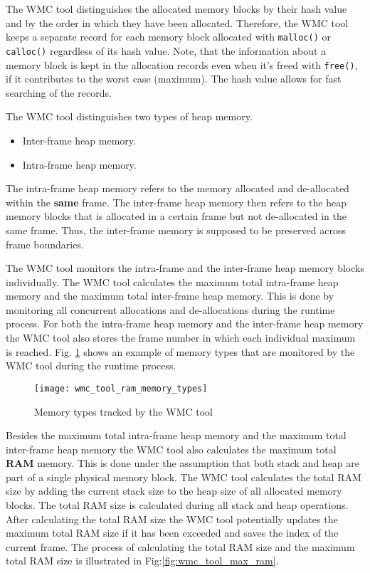 The WMC tool distinguishes the allocated memory blocks by their hash value and by the order in which they have been allocated. Therefore, the WMC tool keeps a separate record for each memory block allocated with \verb|malloc()| or \verb|calloc()| regardless of its hash value. Note, that the information about a memory block is kept in the allocation records even when it's freed with \verb|free()|, if it contributes to the worst case (maximum). The hash value allows for fast searching of the records.

The WMC tool distinguishes two types of heap memory.

\begin{itemize}
  \item Inter-frame heap memory.
  \item Intra-frame heap memory.
\end{itemize}

The intra-frame heap memory refers to the memory allocated and de-allocated within the \textbf{same} frame. The inter-frame heap memory then refers to the heap memory blocks that is allocated in a certain frame but not de-allocated in the same frame. Thus, the inter-frame memory is supposed to be preserved across frame boundaries. 

The WMC tool monitors the intra-frame and the inter-frame heap memory blocks individually. The WMC tool calculates the maximum total intra-frame heap memory and the maximum total inter-frame heap memory. This is done by monitoring all concurrent allocations and de-allocations during the runtime process. For both the intra-frame heap memory and the inter-frame heap memory the WMC tool also stores the frame number in which each individual maximum is reached. Fig. \ref{fig:wmc_tool_ram_memory_types} shows an example of memory types that are monitored by the WMC tool during the runtime process.

\begin{figure}[hbtp]
\begin{center}
\texttt{[image: wmc\_tool\_ram\_memory\_types]}
\end{center}
\caption{Memory types tracked by the WMC tool}
\label{fig:wmc_tool_ram_memory_types}
\end{figure}

Besides the maximum total intra-frame heap memory and the maximum total inter-frame heap memory the WMC tool also calculates the maximum total \textbf{RAM} memory. This is done under the assumption that both stack and heap are part of a single physical memory block. The WMC tool calculates the total RAM size by adding the current stack size to the heap size of all allocated memory blocks. The total RAM size is calculated during all stack and heap operations. After calculating the total RAM size the WMC tool potentially updates the maximum total RAM size if it has been exceeded and saves the index of the current frame. The process of calculating the total RAM size and the maximum total RAM size is illustrated in Fig:\ref{fig:wmc_tool_max_ram}. 


